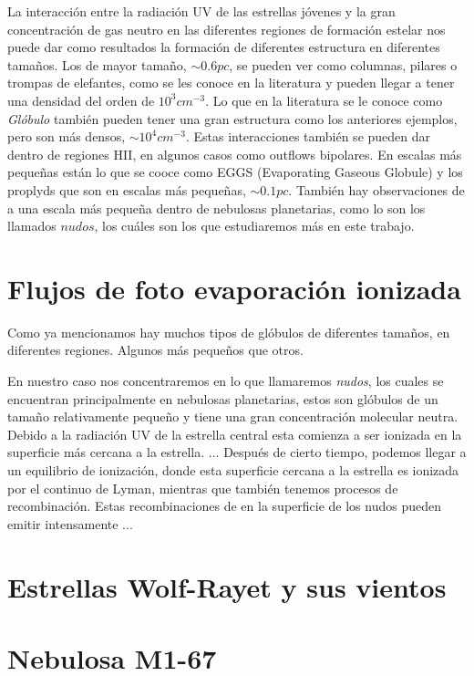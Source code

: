 \documentclass{book}
\begin{document}
La interacción entre la radiación UV de las estrellas jóvenes y la gran concentración de gas neutro en las diferentes regiones de formación estelar nos puede dar como resultados la formación de diferentes estructura en diferentes tamaños. Los de mayor tamaño, $\sim0.6 pc$, se pueden ver como columnas, pilares o trompas de elefantes, como se les conoce en la literatura y pueden llegar a tener una densidad del orden de $10^3cm^{-3}$. Lo que en la literatura se le conoce  como \textit{Glóbulo} también pueden tener una gran estructura como los anteriores ejemplos, pero son más densos, $\sim 10^4cm^{-3}$. Estas interacciones también se pueden dar dentro de regiones HII, en algunos casos como outflows bipolares. En escalas más pequeñas están lo que se cooce como EGGS (Evaporating Gaseous Globule) y los proplyds que son en escalas más pequeñas, $\sim0.1 pc$. También hay observaciones de a una escala más pequeña dentro de nebulosas planetarias, como lo son los llamados $nudos$, los cuáles son los que estudiaremos más en este trabajo.

\section{Flujos de foto evaporación ionizada}

Como ya mencionamos hay muchos tipos de glóbulos de diferentes tamaños, en diferentes regiones. Algunos más pequeños que otros. 

En nuestro caso nos concentraremos en lo que llamaremos \textit{nudos}, los cuales se encuentran principalmente en nebulosas planetarias, estos son glóbulos de un tamaño relativamente pequeño y tiene una gran concentración molecular neutra. Debido a la radiación UV de la estrella central esta comienza a ser ionizada en la superficie más cercana a la estrella. ...
Después de cierto tiempo, podemos llegar a un equilibrio de ionización, donde esta superficie cercana a la estrella es ionizada por el continuo de Lyman, mientras que también tenemos procesos de recombinación. Estas recombinaciones de en la superficie de los nudos pueden emitir intensamente ...

\section{Estrellas Wolf-Rayet y sus vientos}

\section{Nebulosa M1-67}
\end{document}
